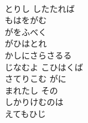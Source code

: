 \documentclass[10pt,b5j]{tarticle} %
\begin{document}
\begin{enumerate}
\begin{minipage}[c]{\blocksize}
    \end{minipage}
    \begin{minipage}[c]{\blocksize}
        
        \vspace{\linespace}
        \item~\\
        とりし したたれば\\
        もはをがむ\\
        がをふべく\\
        がひはとれ\\
        かしにさらさるる\\
        じなむよ こひはくば\\
        さてりこむ がに\\
        まれたし その\\
        しかりけむのは\\
        えてもひじ
    
    \end{minipage}
\end{enumerate} %
\end{document}
